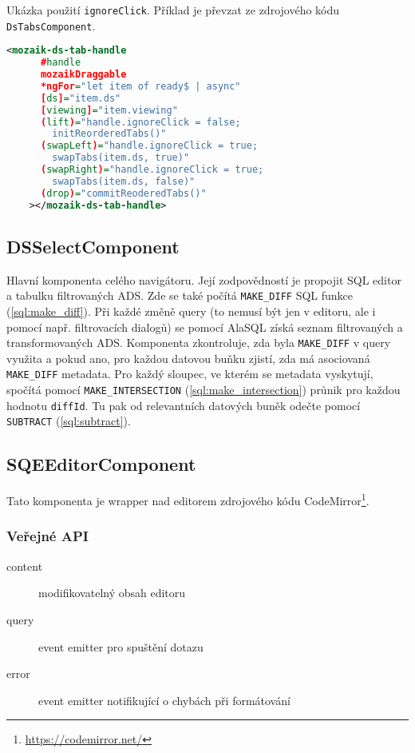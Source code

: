 \begin{exmp}
  Ukázka použití \lstinline|ignoreClick|. Příklad je převzat ze zdrojového kódu \lstinline|DsTabsComponent|.

  \begin{lstlisting}[language=XML]
    <mozaik-ds-tab-handle
      #handle
      mozaikDraggable
      *ngFor="let item of ready$ | async"
      [ds]="item.ds"
      [viewing]="item.viewing"
      (lift)="handle.ignoreClick = false;
        initReorderedTabs()"
      (swapLeft)="handle.ignoreClick = true;
        swapTabs(item.ds, true)"
      (swapRight)="handle.ignoreClick = true;
        swapTabs(item.ds, false)"
      (drop)="commitReoderedTabs()"
    ></mozaik-ds-tab-handle>
  \end{lstlisting}
\end{exmp}

\subsection{DSSelectComponent}
\label{comp:ds-select}

Hlavní komponenta celého navigátoru. Její zodpovědností je propojit SQL editor a tabulku filtrovaných ADS. Zde se také počítá \lstinline|MAKE_DIFF| SQL funkce (\ref{sql:make_diff}). Při každé změně query (to nemusí být jen v editoru, ale i pomocí např. filtrovacích dialogů) se pomocí AlaSQL získá seznam filtrovaných a transformovaných ADS. Komponenta zkontroluje, zda byla \lstinline|MAKE_DIFF| v query využita a pokud ano, pro každou datovou buňku zjistí, zda má asociovaná \lstinline|MAKE_DIFF| metadata. Pro každý sloupec, ve kterém se metadata vyskytují, spočítá pomocí \lstinline|MAKE_INTERSECTION| (\ref{sql:make_intersection}) průnik pro každou hodnotu \lstinline|diffId|. Tu pak od relevantních datových buněk odečte pomocí \lstinline|SUBTRACT| (\ref{sql:subtract}).

\subsection{SQEEditorComponent}

Tato komponenta je wrapper nad editorem zdrojového kódu CodeMirror\footnote{\url{https://codemirror.net/}}.

\subsubsection*{Veřejné API}

\begin{description}
  \item[content] modifikovatelný obsah editoru
  \item[query] event emitter pro spuštění dotazu
  \item[error] event emitter notifikující o chybách při formátování
\end{description}


